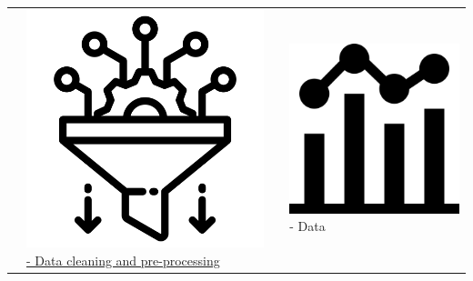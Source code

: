 \documentclass[
  letterpaper,
  DIV=11,
  numbers=noendperiod]{scrreprt}
\begin{document}
\begin{tcolorbox}
\begin{longtable}[]{@{}llll@{}}
& \href{data.html}{\includegraphics{assets/data-processing_icon_2.png} -
Data cleaning and pre-processing} & &
\includegraphics{assets/data_visualization_icon.png} - Data

\end{longtable}
\end{tcolorbox}
\end{document}
